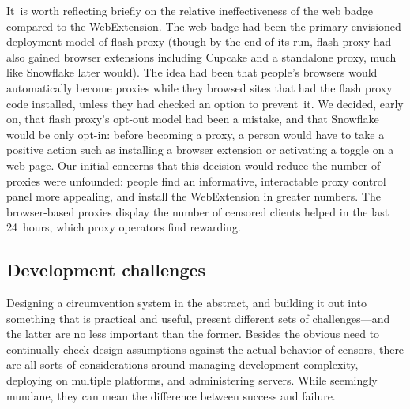 \documentclass[letterpaper,twocolumn]{article}
\begin{document}
It~is worth reflecting briefly
on the relative ineffectiveness of the web badge
compared to the WebExtension.
The web badge had been the primary envisioned deployment model of flash proxy
(though by the end of its run, flash proxy had also gained
browser extensions including Cupcake
and a standalone proxy,
much like Snowflake later would).
The idea had been that people's browsers
would automatically become proxies
while they browsed sites that had the flash proxy code installed,
unless they had checked an option to prevent~it.
We decided, early on, that flash proxy's opt-out model had been a mistake,
%
and that Snowflake would be only opt-in:
before becoming a proxy, a person would have to take a positive action
such as installing a browser extension
or activating a toggle on a web page.
Our initial concerns that this decision
would reduce the number of proxies were unfounded:
people find an informative, interactable proxy control panel more appealing,
and install the WebExtension in greater numbers.
The browser-based proxies display the number of censored clients
helped in the last 24~hours,
which proxy operators find rewarding.

\subsection{Development challenges}
\label{sec:challenges}

Designing a circumvention system in the abstract,
and building it out into something that is practical and useful,
present different sets of challenges---and
the latter are no less important than the former.
Besides the obvious need
to continually check design assumptions
against the actual behavior of censors,
there are all sorts of considerations around
managing development complexity,
deploying on multiple platforms,
and administering servers.
While seemingly mundane, they can mean the difference between success and failure.
\end{document}
